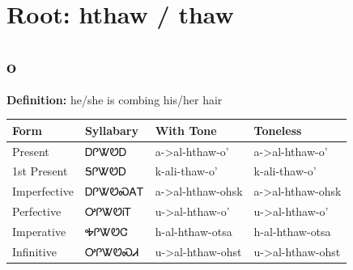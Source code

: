 \documentclass{article}%
\begin{document}
%
\normalsize%
\section*{Root: hthaw / thaw}%
\subsection*{o}%
\textbf{Definition: }%
he/she is combing his/her hair%
\\[0.5em]%
\begin{tabular}{|l|l|l|l|}%
\hline%
\textbf{Form}&\textbf{Syllabary}&\textbf{With Tone}&\textbf{Toneless}\\%
\hline%
Present&ᎠᎵᏔᏬᎠ&a{-}>al{-}hthaw{-}o'&a{-}>al{-}hthaw{-}o'\\%
1st Present&ᎦᎵᏔᏬᎠ&k{-}ali{-}thaw{-}o'&k{-}ali{-}thaw{-}o'\\%
Imperfective&ᎠᎵᏔᏬᏍᎪᎢ&a{-}>al{-}hthaw{-}ohsk&a{-}>al{-}hthaw{-}ohsk\\%
Perfective&ᎤᎵᏔᏬᎥᎢ&u{-}>al{-}hthaw{-}o'&u{-}>al{-}hthaw{-}o'\\%
Imperative&ᎭᎵᏔᏬᏣ&h{-}al{-}hthaw{-}otsa&h{-}al{-}hthaw{-}otsa\\%
Infinitive&ᎤᎵᏔᏬᏍᏗ&u{-}>al{-}hthaw{-}ohst&u{-}>al{-}hthaw{-}ohst\\%
\hline%
\end{tabular}%
\\[1em]%
\end{document}

